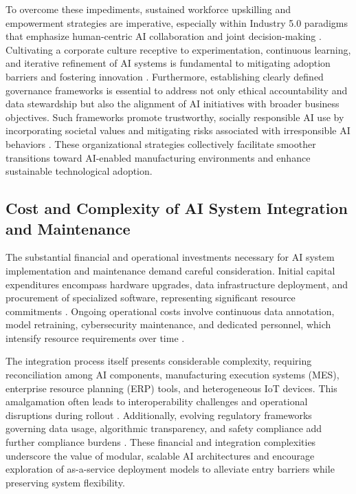 \documentclass[sigconf]{acmart}
\begin{document}
To overcome these impediments, sustained workforce upskilling and empowerment strategies are imperative, especially within Industry 5.0 paradigms that emphasize human-centric AI collaboration and joint decision-making \cite{ref3}. Cultivating a corporate culture receptive to experimentation, continuous learning, and iterative refinement of AI systems is fundamental to mitigating adoption barriers and fostering innovation \cite{ref26,ref38}. Furthermore, establishing clearly defined governance frameworks is essential to address not only ethical accountability and data stewardship but also the alignment of AI initiatives with broader business objectives. Such frameworks promote trustworthy, socially responsible AI use by incorporating societal values and mitigating risks associated with irresponsible AI behaviors \cite{ref26}. These organizational strategies collectively facilitate smoother transitions toward AI-enabled manufacturing environments and enhance sustainable technological adoption.

\subsection{Cost and Complexity of AI System Integration and Maintenance}

The substantial financial and operational investments necessary for AI system implementation and maintenance demand careful consideration. Initial capital expenditures encompass hardware upgrades, data infrastructure deployment, and procurement of specialized software, representing significant resource commitments \cite{ref11,ref12,ref35}. Ongoing operational costs involve continuous data annotation, model retraining, cybersecurity maintenance, and dedicated personnel, which intensify resource requirements over time \cite{ref7,ref9,ref20}.

The integration process itself presents considerable complexity, requiring reconciliation among AI components, manufacturing execution systems (MES), enterprise resource planning (ERP) tools, and heterogeneous IoT devices. This amalgamation often leads to interoperability challenges and operational disruptions during rollout \cite{ref6,ref44}. Additionally, evolving regulatory frameworks governing data usage, algorithmic transparency, and safety compliance add further compliance burdens \cite{ref2,ref13}. These financial and integration complexities underscore the value of modular, scalable AI architectures and encourage exploration of as-a-service deployment models to alleviate entry barriers while preserving system flexibility.
\end{document}
